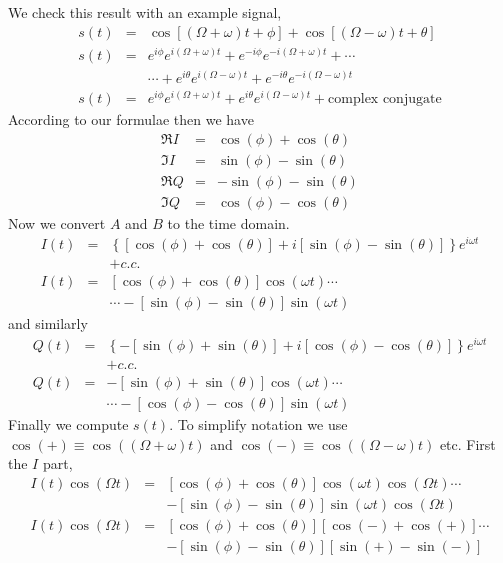 \documentclass{article}
\begin{document}
We check this result with an example signal,\begin{eqnarray*}
s(t) & = & \cos\left[\left(\Omega+\omega\right)t+\phi\right]+\cos\left[\left(\Omega-\omega\right)t+\theta\right]\\
s(t) & = & e^{i\phi}e^{i(\Omega+\omega)t}+e^{-i\phi}e^{-i(\Omega+\omega)t}+\cdots\\
 &  & \cdots+e^{i\theta}e^{i(\Omega-\omega)t}+e^{-i\theta}e^{-i(\Omega-\omega)t}\\
s(t) & = & e^{i\phi}e^{i(\Omega+\omega)t}+e^{i\theta}e^{i(\Omega-\omega)t}+\textrm{complex conjugate}\end{eqnarray*}
 According to our formulae then we have\begin{eqnarray*}
\Re I & = & \cos(\phi)+\cos(\theta)\\
\Im I & = & \sin(\phi)-\sin(\theta)\\
\Re Q & = & -\sin(\phi)-\sin(\theta)\\
\Im Q & = & \cos(\phi)-\cos(\theta)\end{eqnarray*}
 Now we convert $A$ and $B$ to the time domain.\begin{eqnarray*}
I(t) & = & \left\{ \left[\cos(\phi)+\cos(\theta)\right]+i\left[\sin(\phi)-\sin(\theta)\right]\right\} e^{i\omega t}\\
 &  & +c.c.\\
I(t) & = & \left[\cos(\phi)+\cos(\theta)\right]\cos\left(\omega t\right)\cdots\\
 &  & \cdots-\left[\sin(\phi)-\sin(\theta)\right]\sin\left(\omega t\right)\end{eqnarray*}
 and similarly\begin{eqnarray*}
Q(t) & = & \left\{ -\left[\sin(\phi)+\sin(\theta)\right]+i\left[\cos(\phi)-\cos(\theta)\right]\right\} e^{i\omega t}\\
 &  & +c.c.\\
Q(t) & = & -\left[\sin(\phi)+\sin(\theta)\right]\cos\left(\omega t\right)\cdots\\
 &  & \cdots-\left[\cos(\phi)-\cos(\theta)\right]\sin\left(\omega t\right)\end{eqnarray*}
 Finally we compute $s(t)$. To simplify notation we use $\cos(+)\equiv\cos\left(\left(\Omega+\omega\right)t\right)$
and $\cos(-)\equiv\cos\left(\left(\Omega-\omega\right)t\right)$ etc.
First the $I$ part, \begin{eqnarray*}
I(t)\cos\left(\Omega t\right) & = & \left[\cos(\phi)+\cos(\theta)\right]\cos\left(\omega t\right)\cos\left(\Omega t\right)\cdots\\
 &  & -\left[\sin(\phi)-\sin(\theta)\right]\sin\left(\omega t\right)\cos\left(\Omega t\right)\\
I(t)\cos\left(\Omega t\right) & = & \left[\cos(\phi)+\cos(\theta)\right]\left[\cos(-)+\cos(+)\right]\cdots\\
 &  & -\left[\sin(\phi)-\sin(\theta)\right]\left[\sin(+)-\sin(-)\right]\end{eqnarray*}
\end{document}
